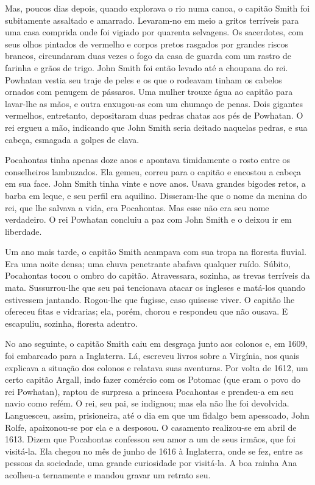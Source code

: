 Mas, poucos dias depois, quando explorava o rio numa canoa, o capitão Smith
foi subitamente assaltado e amarrado. Levaram-no em meio a gritos
terríveis para uma casa comprida onde foi vigiado por quarenta selvagens.
Os sacerdotes, com seus olhos pintados de vermelho e corpos pretos
rasgados por grandes riscos brancos, circundaram duas vezes o fogo da casa
de guarda com um rastro de farinha e grãos de trigo. John Smith foi então
levado até a choupana do rei. Powhatan vestia seu traje de peles e os que
o rodeavam tinham os cabelos ornados com penugem de pássaros. Uma mulher
trouxe água ao capitão para lavar-lhe as mãos, e outra enxugou-as com um
chumaço de penas. Dois gigantes vermelhos, entretanto, depositaram duas
pedras chatas aos pés de Powhatan. O rei ergueu a mão, indicando que John
Smith seria deitado naquelas pedras, e sua cabeça, esmagada a golpes de
clava.

Pocahontas tinha apenas doze anos e apontava timidamente o rosto entre os
conselheiros lambuzados. Ela gemeu, correu para o capitão e encostou a
cabeça em sua face. John Smith tinha vinte e nove anos. Usava grandes
bigodes retos, a barba em leque, e seu perfil era aquilino. Disseram-lhe
que o nome da menina do rei, que lhe salvava a vida, era Pocahontas. Mas
esse não era seu nome verdadeiro. O rei Powhatan concluiu a paz com John
Smith e o deixou ir em liberdade.

Um ano mais tarde, o capitão Smith acampava com sua tropa na floresta
fluvial. Era uma noite densa; uma chuva penetrante abafava qualquer ruído.
Súbito, Pocahontas tocou o ombro do capitão. Atravessara, sozinha, as
trevas terríveis da mata. Sussurrou-lhe que seu pai tencionava atacar os
ingleses e matá-los quando estivessem jantando. Rogou-lhe que fugisse,
caso quisesse viver. O capitão lhe ofereceu fitas e vidrarias; ela, porém,
chorou e respondeu que não ousava. E escapuliu, sozinha, floresta adentro.

No ano seguinte, o capitão Smith caiu em desgraça junto aos colonos e, em
1609, foi embarcado para a Inglaterra. Lá, escreveu livros sobre a
Virgínia, nos quais explicava a situação dos colonos e relatava suas
aventuras. Por volta de 1612, um certo capitão Argall, indo fazer comércio
com os Potomac (que eram o povo do rei Powhatan), raptou de surpresa a
princesa Pocahontas e prendeu-a em seu navio como refém. O rei, seu pai,
se indignou; mas ela não lhe foi devolvida. Languesceu, assim,
prisioneira, até o dia em que um fidalgo bem apessoado, John Rolfe,
apaixonou-se por ela e a desposou. O casamento realizou-se em abril de
1613. Dizem que Pocahontas confessou seu amor a um de seus irmãos, que foi
visitá-la. Ela chegou no mês de junho de 1616 à Inglaterra, onde se fez,
entre as pessoas da sociedade, uma grande curiosidade por visitá-la. A boa
rainha Ana acolheu-a ternamente e mandou gravar um retrato seu.

